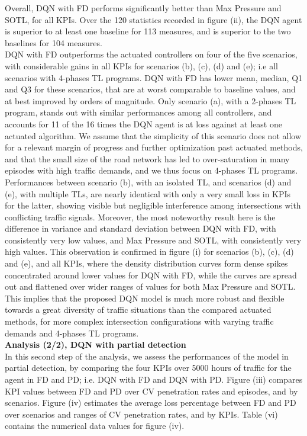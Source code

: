 Overall, DQN with FD performs significantly better than Max Pressure and SOTL, for all KPIs. Over the 120 statistics recorded in figure (ii), the DQN agent is superior to at least one baseline for 113 measures, and is superior to the two baselines for 104 measures. \\
DQN with FD outperforms the actuated controllers on four of the five scenarios, with considerable gains in all KPIs for scenarios (b), (c), (d) and (e); i.e all scenarios with 4-phases TL programs.
DQN with FD has lower mean, median, Q1 and Q3 for these scenarios, that are at worst comparable to baseline values, and at best improved by orders of magnitude. Only scenario (a), with a 2-phases TL program, stands out with similar performances among all controllers, and accounts for 11 of the 16 times the DQN agent is at loss against at least one actuated algorithm. We assume that the simplicity of this scenario does not allow for a relevant margin of progress and further optimization past actuated methods, and that the small size of the road network has led to over-saturation in many episodes with high traffic demands, and we thus focus on 4-phases TL programs. 
Performances between scenario (b), with an isolated TL, and scenarios (d) and (e), with multiple TLs, are nearly identical with only a very small loss in KPIs for the latter, showing visible but negligible interference among intersections with conflicting traffic signals.
Moreover, the most noteworthy result here is the difference in variance and standard deviation between DQN with FD, with consistently very low values, and Max Pressure and SOTL, with consistently very high values. This observation is confirmed in figure (i) for scenarios (b), (c), (d) and (e), and all KPIs, where the density distribution curves form dense spikes concentrated around lower values for DQN with FD, while the curves are spread out and flattened over wider ranges of values for both Max Pressure and SOTL. This implies that the proposed DQN model is much more robust and flexible towards a great diversity of traffic situations than the compared actuated methods, for more complex intersection configurations with varying traffic demands and 4-phases TL programs. \\

\textbf{Analysis (2/2), DQN with partial detection} \\
In this second step of the analysis, we assess the performances of the model in partial detection, by comparing the four KPIs over 5000 hours of traffic for the agent in FD and PD; i.e. DQN with FD and DQN with PD. Figure (iii) compares KPI values between FD and PD over CV penetration rates and episodes, and by scenarios. Figure (iv) estimates the average loss percentage between FD and PD over scenarios and ranges of CV penetration rates, and by KPIs. Table (vi) contains the numerical data values for figure (iv). \\

